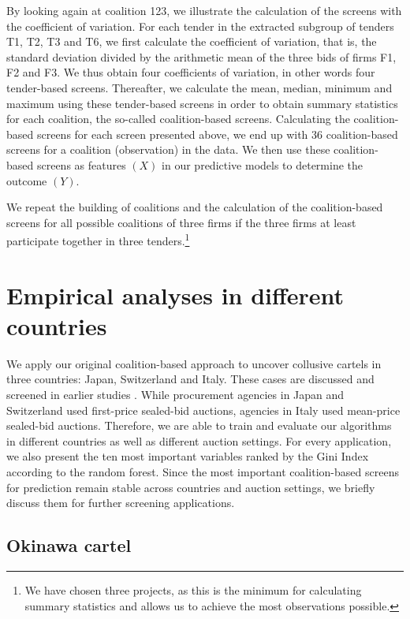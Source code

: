 \documentclass[a4paper,11pt]{article}
\begin{document}
	By looking again at coalition 123, we illustrate the calculation of the screens with the coefficient of variation. For each tender in the extracted subgroup of tenders T1, T2, T3 and T6, we first calculate the coefficient of variation, that is, the standard deviation divided by the arithmetic mean of the three bids of firms F1, F2 and F3. We thus obtain four coefficients of variation, in other words four tender-based screens. Thereafter, we calculate the mean, median, minimum and maximum using these tender-based screens in order to obtain summary statistics for each coalition, the so-called coalition-based screens.  Calculating the coalition-based screens for each screen presented above, we end up with 36 coalition-based screens for a coalition (observation) in the data. We then use these coalition-based screens as features $(X)$ in our predictive models to determine the outcome $(Y)$. 
	
	We repeat the building of coalitions and the calculation of the coalition-based screens for all possible coalitions of three firms if the three firms at least participate together in three tenders.\footnote{We have chosen three projects, as this is the minimum for calculating summary statistics and allows us to achieve the most observations possible.}
	
	\section{Empirical analyses in different countries}\label{empanaly}
	
	We apply our original coalition-based approach to uncover collusive cartels in three countries: Japan, Switzerland and Italy. These cases are discussed and screened in earlier studies \citep[see][]{conley2016detecting,wallimann2020machine,huber2019machine,ishii2014bid}. While procurement agencies in Japan and Switzerland used first-price sealed-bid auctions, agencies in Italy used mean-price sealed-bid auctions. Therefore, we are able to train and evaluate our algorithms in different countries as well as different auction settings. For every application, we also present the ten most important variables ranked by the Gini Index according to the random forest. Since the most important coalition-based screens for prediction remain stable across countries and auction settings, we briefly discuss them for further screening applications. 
	
	\subsection{Okinawa cartel}
	
\end{document}

